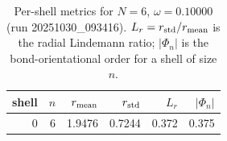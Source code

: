 \begin{table}[t]
\centering
\small
\setlength{\tabcolsep}{4pt}
\renewcommand{\arraystretch}{1.15}
\begin{tabular}{r r r r r r}
\toprule
shell & $n$ & $r_{\rm mean}$ & $r_{\rm std}$ & $L_r$ & $|\Phi_n|$ \\
\midrule
0 & 6 & 1.9476 & 0.7244 & 0.372 & 0.375 \\
\bottomrule
\end{tabular}
\caption{Per-shell metrics for $N=6$, $\omega=0.10000$ (run 20251030_093416). $L_r=r_{\rm std}/r_{\rm mean}$ is the radial Lindemann ratio; $|\Phi_n|$ is the bond-orientational order for a shell of size $n$.}
\end{table}